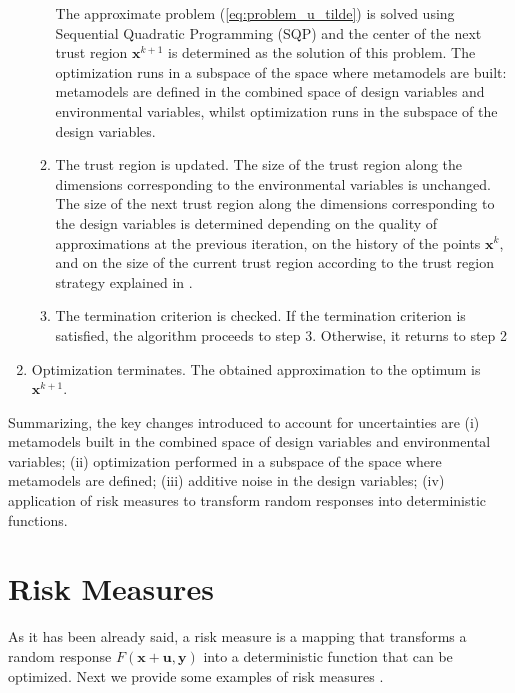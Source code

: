 \documentclass{llncs}
\begin{document}
\begin{enumerate}
\begin{enumerate}[label=(\alph*)]
    The approximate problem (\ref{eq:problem_u_tilde}) is solved using Sequential Quadratic Programming (SQP) and the center of the next trust region $\boldsymbol x^{k+1}$ is determined as the solution of this problem. The optimization runs in a subspace of the space where metamodels are built: metamodels are defined in the combined space of design variables and environmental variables, whilst optimization runs in the subspace of the design variables.
    \item The trust region is updated. The size of the trust region along the dimensions corresponding to the environmental variables is unchanged. The size of the next trust region along the dimensions corresponding to the design variables is determined depending on the quality of approximations at the previous iteration, on the history of the points $\boldsymbol x^k$, and on the size of the current trust region according to the trust region strategy explained in \cite{KeulenToropovMarkine1996}.
    \item The termination criterion is checked. If the termination criterion is satisfied, the algorithm proceeds to step 3. Otherwise, it returns to step 2
  \end{enumerate}
  \item Optimization terminates. The obtained approximation to the optimum is $\boldsymbol x^{k+1}$.
\end{enumerate}

Summarizing, the key changes introduced to account for uncertainties are (i) metamodels built in the combined space of design variables and environmental variables; (ii) optimization performed in a subspace of the space where metamodels are defined; (iii) additive noise in the design variables; (iv) application of risk measures to transform random responses into deterministic functions.

\section{Risk Measures}
\label{sec:risk}

As it has been already said, a risk measure is a mapping that transforms a random response $F(\boldsymbol x+ \boldsymbol u,\boldsymbol y)$  into a deterministic function that can be optimized. Next we provide some examples of risk measures \cite{RockafellarUryasev2000,SchillingsSchulz2015}.
\end{document}
